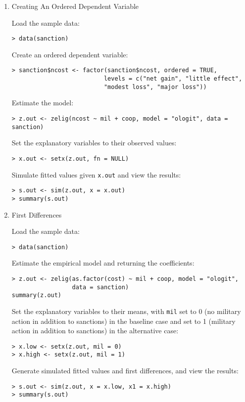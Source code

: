 \begin{enumerate}

\item {Creating An Ordered Dependent Variable} \label{ord.fact}

Load the sample data:  
\begin{verbatim}
> data(sanction)
\end{verbatim}
Create an ordered dependent variable: 
\begin{verbatim}
> sanction$ncost <- factor(sanction$ncost, ordered = TRUE,
                          levels = c("net gain", "little effect", 
                          "modest loss", "major loss"))
\end{verbatim}
Estimate the model:
\begin{verbatim}
> z.out <- zelig(ncost ~ mil + coop, model = "ologit", data = sanction)
\end{verbatim}
Set the explanatory variables to their observed values:  
\begin{verbatim}
> x.out <- setx(z.out, fn = NULL)
\end{verbatim}
Simulate fitted values given {\tt x.out} and view the results:
\begin{verbatim}
> s.out <- sim(z.out, x = x.out)
> summary(s.out)
\end{verbatim}

\item {First Differences}

Load the sample data: 
\begin{verbatim}
> data(sanction)
\end{verbatim}
Estimate the empirical model and returning the coefficients:
\begin{verbatim}
> z.out <- zelig(as.factor(cost) ~ mil + coop, model = "ologit", 
                 data = sanction)
summary(z.out)
\end{verbatim}
Set the explanatory variables to their means, with {\tt mil} set
to 0 (no military action in addition to sanctions) in the baseline
case and set to 1 (military action in addition to sanctions) in the
alternative case:
\begin{verbatim}
> x.low <- setx(z.out, mil = 0)
> x.high <- setx(z.out, mil = 1)
\end{verbatim}
Generate simulated fitted values and first differences, and view the results:
\begin{verbatim}
> s.out <- sim(z.out, x = x.low, x1 = x.high)
> summary(s.out)
\end{verbatim}
\end{enumerate}

